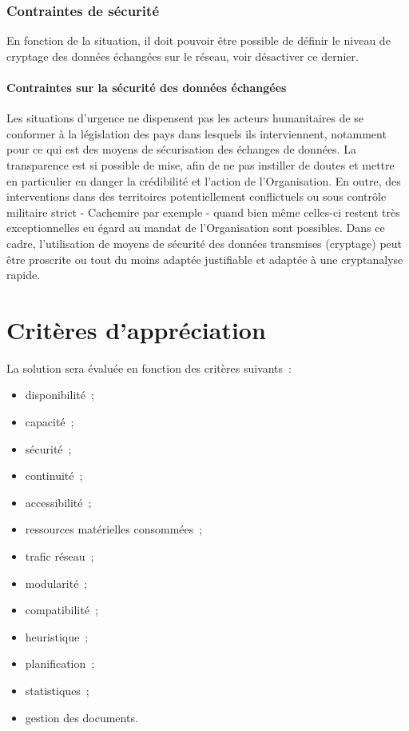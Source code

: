 \subsubsection{Contraintes de sécurité}
En fonction de la situation, il doit pouvoir être possible de définir le niveau de cryptage des données échangées sur le réseau, voir désactiver ce dernier.

\paragraph{Contraintes sur la sécurité des données échangées}
Les situations d'urgence ne dispensent pas les acteurs humanitaires de se conformer à la législation des pays dans lesquels ils interviennent, notamment pour ce qui est des moyens de sécurisation des échanges de données. La transparence est si possible de mise, afin de ne pas instiller de doutes et mettre en particulier en danger la crédibilité et l'action de l'Organisation. En outre, des interventions dans des territoires potentiellement conflictuels ou sous contrôle militaire strict - Cachemire par exemple - quand bien même celles-ci restent très exceptionnelles eu égard au mandat de l'Organisation sont possibles. Dans ce cadre, l'utilisation de moyens de sécurité des données transmises (cryptage) peut être proscrite ou tout du moins adaptée justifiable et adaptée à une cryptanalyse \og{}rapide\fg{}.

\section{Critères d'appréciation}
La solution sera évaluée en fonction des critères suivants~:
\begin{itemize}
\item disponibilité~;
\item capacité~;
\item sécurité~;
\item continuité~;
\item accessibilité~;
\item ressources matérielles consommées~;
\item trafic réseau~;
\item modularité~;
\item compatibilité~;
\item heuristique~;
\item planification~;
\item statistiques~;
\item gestion des documents.
\end{itemize}

